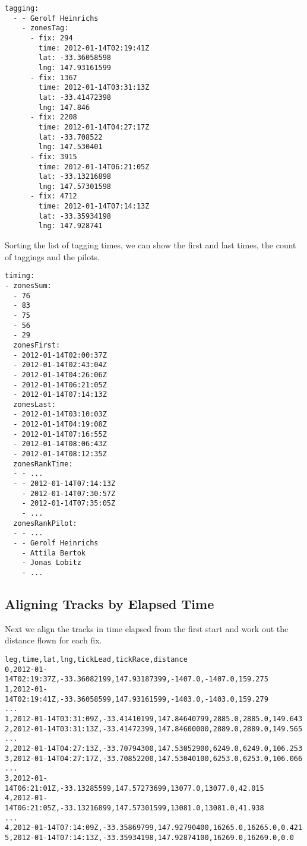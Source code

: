 \documentclass[gap.tex]{subfiles}
\begin{document}
\begin{lstlisting}[caption={Selected taggings, one for each zone, \texttt{tagging} nodes of \texttt{*.tag-zone.yaml}.}]
tagging:
  - - Gerolf Heinrichs
    - zonesTag:
      - fix: 294
        time: 2012-01-14T02:19:41Z
        lat: -33.36058598
        lng: 147.93161599
      - fix: 1367
        time: 2012-01-14T03:31:13Z
        lat: -33.41472398
        lng: 147.846
      - fix: 2208
        time: 2012-01-14T04:27:17Z
        lat: -33.708522
        lng: 147.530401
      - fix: 3915
        time: 2012-01-14T06:21:05Z
        lat: -33.13216898
        lng: 147.57301598
      - fix: 4712
        time: 2012-01-14T07:14:13Z
        lat: -33.35934198
        lng: 147.928741
\end{lstlisting}

Sorting the list of tagging times, we can show the first and last times, the
count of taggings and the pilots.

\begin{lstlisting}[caption={The count of pilots tagging zones and the times of these taggings, \texttt{timing} nodes of \texttt{*.tag-zone.yaml}.}]
timing:
- zonesSum:
  - 76
  - 83
  - 75
  - 56
  - 29
  zonesFirst:
  - 2012-01-14T02:00:37Z
  - 2012-01-14T02:43:04Z
  - 2012-01-14T04:26:06Z
  - 2012-01-14T06:21:05Z
  - 2012-01-14T07:14:13Z
  zonesLast:
  - 2012-01-14T03:10:03Z
  - 2012-01-14T04:19:08Z
  - 2012-01-14T07:16:55Z
  - 2012-01-14T08:06:43Z
  - 2012-01-14T08:12:35Z
  zonesRankTime:
  - - ...
  - - 2012-01-14T07:14:13Z
    - 2012-01-14T07:30:57Z
    - 2012-01-14T07:35:05Z
    - ...
  zonesRankPilot:
  - - ...
  - - Gerolf Heinrichs
    - Attila Bertok
    - Jonas Lobitz
    - ...
\end{lstlisting}

\newpage
\subsection{Aligning Tracks by Elapsed Time}

Next we align the tracks in time elapsed from the first start and work out the
distance flown for each fix.

\begin{lstlisting}[caption={Fixes aligned in time with distance flown, rows of \texttt{*.align-time.csv}}]
leg,time,lat,lng,tickLead,tickRace,distance
0,2012-01-14T02:19:37Z,-33.36082199,147.93187399,-1407.0,-1407.0,159.275
1,2012-01-14T02:19:41Z,-33.36058599,147.93161599,-1403.0,-1403.0,159.279
...
1,2012-01-14T03:31:09Z,-33.41410199,147.84640799,2885.0,2885.0,149.643
2,2012-01-14T03:31:13Z,-33.41472399,147.84600000,2889.0,2889.0,149.565
...
2,2012-01-14T04:27:13Z,-33.70794300,147.53052900,6249.0,6249.0,106.253
3,2012-01-14T04:27:17Z,-33.70852200,147.53040100,6253.0,6253.0,106.066
...
3,2012-01-14T06:21:01Z,-33.13285599,147.57273699,13077.0,13077.0,42.015
4,2012-01-14T06:21:05Z,-33.13216899,147.57301599,13081.0,13081.0,41.938
...
4,2012-01-14T07:14:09Z,-33.35869799,147.92790400,16265.0,16265.0,0.421
5,2012-01-14T07:14:13Z,-33.35934198,147.92874100,16269.0,16269.0,0.0
\end{lstlisting}
\end{document}
